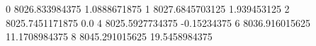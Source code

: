 0 8026.833984375 1.0888671875
1 8027.6845703125 1.939453125
2 8025.7451171875 0.0
4 8025.5927734375 -0.15234375
6 8036.916015625 11.1708984375
8 8045.291015625 19.5458984375
